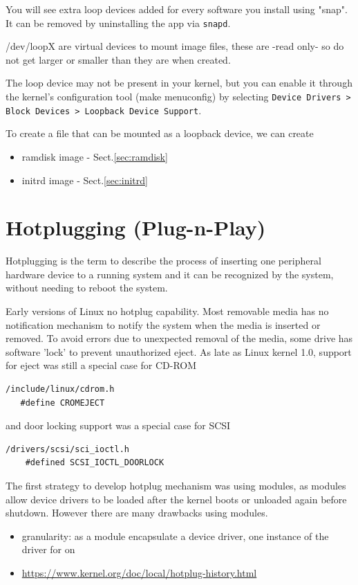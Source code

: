 You will see extra loop devices added for every software you install using
"snap". It can be removed by uninstalling the app via \verb!snapd!.

/dev/loopX are virtual devices to mount image files, these are -read only- so do
not get larger or smaller than they are when created.

The loop device may not be present in your kernel, but you can enable it
through the kernel's configuration tool (make menuconfig) by selecting 
\verb!Device Drivers > Block Devices > Loopback Device Support!.
  
To create a file that can be mounted as a loopback device,
we can create
\begin{itemize}
  \item ramdisk image - Sect.\ref{sec:ramdisk}
  \item initrd image - Sect.\ref{sec:initrd}
\end{itemize}



\section{Hotplugging (Plug-n-Play)}
\label{sec:PnP_plugNplay}

Hotplugging is the term to describe the process of inserting one peripheral
hardware device to a running system and it can be recognized by the system,
without needing to reboot the system. 

Early versions of Linux no hotplug capability. Most removable media has no
notification mechanism to notify the system when the media is inserted or
removed. To avoid errors due to unexpected removal of the media, some drive has
software 'lock' to prevent unauthorized eject. As late as Linux kernel 1.0,
support for eject was still a special case for CD-ROM
\begin{verbatim}
/include/linux/cdrom.h 
   #define CROMEJECT
\end{verbatim}
and door locking support was a special case for SCSI 
\begin{verbatim}
/drivers/scsi/sci_ioctl.h 
    #defined SCSI_IOCTL_DOORLOCK
\end{verbatim}

The first strategy to develop hotplug mechanism was using modules, as modules
allow device drivers to be loaded after the kernel boots or unloaded again
before shutdown. However there are many drawbacks using modules. 
\begin{itemize}
  \item granularity: as a module encapsulate a device driver, one instance of
  the driver for on
  
  \item \url{https://www.kernel.org/doc/local/hotplug-history.html}
\end{itemize}



